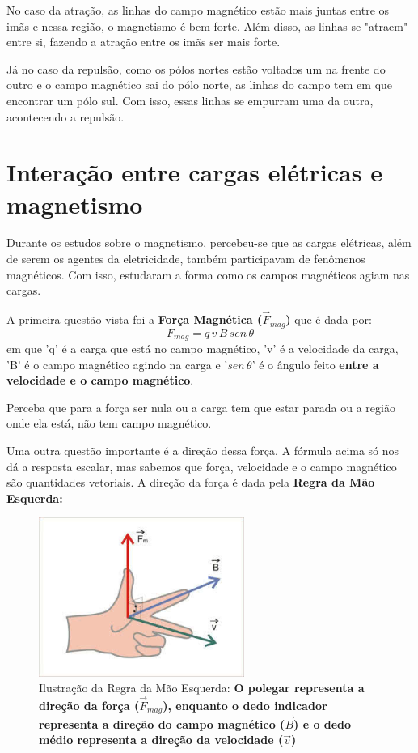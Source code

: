 \documentclass[12pt]{extarticle}
\newcommand{\<}{\langle}
\renewcommand{\>}{\rangle}
\theoremstyle{definition}
\begin{document}
No caso da atração, as linhas do campo magnético estão mais juntas entre os imãs e nessa região, o magnetismo é bem forte. Além disso, as linhas se "atraem" entre si, fazendo a atração entre os imãs ser mais forte. 

Já no caso da repulsão, como os pólos nortes estão voltados um na frente do outro e o campo magnético sai do pólo norte, as linhas do campo tem em que encontrar um pólo sul. Com isso, essas linhas se empurram uma da outra, acontecendo a repulsão.

\section{Interação entre cargas elétricas e magnetismo}
Durante os estudos sobre o magnetismo, percebeu-se que as cargas elétricas, além de serem os agentes da eletricidade, também participavam de fenômenos magnéticos. Com isso, estudaram a forma como os campos magnéticos agiam nas cargas.

A primeira questão vista foi a \textbf{Força Magnética ($\vec{F}_{mag}$)} que é dada por:
\begin{equation}
    F_{mag} = q\,v\,B\,sen\,\theta
\end{equation}
\noindent em que 'q' é a carga que está no campo magnético, 'v' é a velocidade da carga, 'B' é o campo magnético agindo na carga e '$sen\,\theta$' é o ângulo feito \textbf{entre a velocidade e o campo magnético}.

Perceba que para a força ser nula ou a carga tem que estar parada ou a região onde ela está, não tem campo magnético.

Uma outra questão importante é a direção dessa força. A fórmula acima só nos dá a resposta escalar, mas sabemos que força, velocidade e o campo magnético são quantidades vetoriais. A direção da força é dada pela \textbf{Regra da Mão Esquerda:}
\begin{figure}[H]
    \centering
    \includegraphics[width=0.6\textwidth]{regra_mao_esquerda.jpg}
    \caption{Ilustração da Regra da Mão Esquerda: \textbf{O polegar representa a direção da força ($\vec{F}_{mag}$), enquanto o dedo indicador representa a direção do campo magnético ($\vec{B}$) e o dedo médio representa a direção da velocidade ($\vec{v}$)}}
    \label{fig:my_label}
\end{figure}
\end{document}
